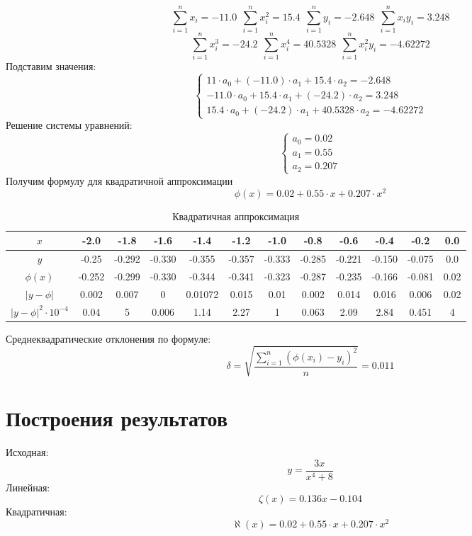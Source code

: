 \documentclass{article}
\begin{document}
\[
\sum_{i=1}^{n}x_i = -11.0\ \ 
\sum_{i=1}^{n}x_i^2 = 15.4\ \ 
\sum_{i=1}^{n}y_i = -2.648\ \ 
\sum_{i=1}^{n}x_iy_i = 3.248 \]
\[
\sum_{i=1}^{n}x_i^3 = -24.2\ \ 
\sum_{i=1}^{n}x_i^4 = 40.5328\ \
\sum_{i=1}^{n}x_i^2y_i = -4.62272 \]
Подставим значения:
\[
\begin{cases}
    11\cdot a_0 + (-11.0)\cdot a_1  + 15.4\cdot a_2  = -2.648 \\
    -11.0\cdot a_0 + 15.4\cdot a_1 + (-24.2)\cdot a_2 = 3.248 \\
    15.4\cdot a_0 + (-24.2)\cdot a_1 + 40.5328\cdot a_2 = -4.62272
\end{cases}
\]
Решение системы уравнений:
\[
\begin{cases}
a_0 = 0.02 \\
a_1 = 0.55 \\
a_2 = 0.207
\end{cases}
\]
Получим формулу для квадратичной аппроксимации 
\[\phi(x) = 0.02 + 0.55\cdot x + 0.207\cdot x^2\]

\begin{center}
    \begin{table}[H]
        \centering
        \begin{tabular}{|c|c|c|c|c|c|c|c|c|c|c|c|}
            \hline
            \( x \) & -2.0 & -1.8 & -1.6 & -1.4 & -1.2 & -1.0 & -0.8 & -0.6 & -0.4 & -0.2 & 0.0 \\
            \hline
            \( y\) & -0.25 & -0.292 & -0.330 & -0.355 & -0.357 & -0.333 & -0.285 & -0.221 & -0.150 & -0.075 & 0.0 \\
            \hline
            \(\phi(x)\) &-0.252& -0.299& -0.330& -0.344& -0.341& -0.323& -0.287& -0.235& -0.166& -0.081& 0.02  \\
            \hline
            \(|y-\phi|\)&0.002& 0.007& 0& 0.01072& 0.015& 0.01& 0.002& 0.014& 0.016& 0.006& 0.02 \\
            \hline
            \(|y-\phi|^2\cdot 10^{-4}\)&0.04&5&0.006&1.14&2.27&1&0.063&2.09&2.84&0.451&4\\
            \hline
        \end{tabular}
        \caption{Квадратичная аппроксимация}
    \end{table}
\end{center}
Среднеквадратические отклонения по формуле:
\[\delta = \sqrt{\frac{\sum_{i=1}^{n}(\phi(x_i) - y_i)^2}{n}} = 0.011\]
\section{Построения результатов}
Исходная:
\[y = \frac{3x}{x^4+8}\]
Линейная:
\[\zeta(x) = 0.136x-0.104\]
Квадратичная:
\[\aleph(x) = 0.02 + 0.55\cdot x + 0.207\cdot x^2\]
\end{document}
